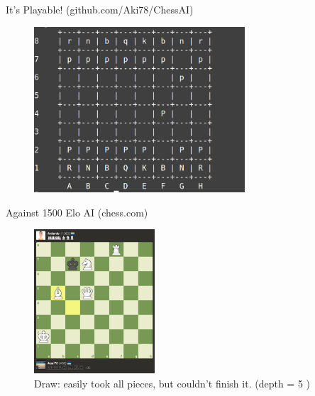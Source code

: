 \documentclass{beamer}
\begin{document}
\begin{frame}{It's Playable! (github.com/Aki78/ChessAI)}
    \begin{figure}
        \centering
        \includegraphics[width=0.7\textwidth]{playable.png} %

    \end{figure}
\end{frame}


\begin{frame}{Against 1500 Elo AI (chess.com)}
    \begin{figure}
        \centering
        \includegraphics[width=0.4\textwidth]{play1500.png} %
        \caption{Draw: easily took all pieces, but couldn't finish it. (depth = 5 )}

    \end{figure}
\end{frame}

%
\end{document}
